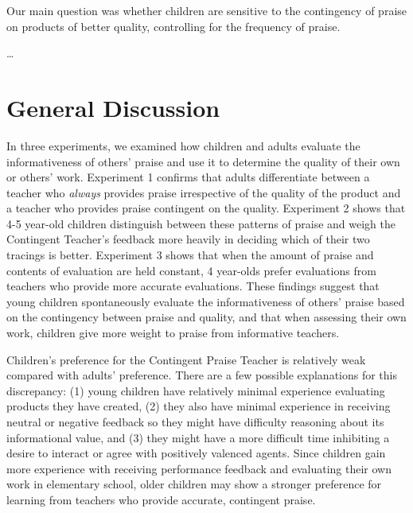 \documentclass[10pt, letterpaper]{article}
\begin{document}
Our main question was whether children are sensitive to the contingency
of praise on products of better quality, controlling for the frequency
of praise.

\ldots{}

\section{General Discussion}\label{general-discussion}

In three experiments, we examined how children and adults evaluate the
informativeness of others' praise and use it to determine the quality of
their own or others' work. Experiment 1 confirms that adults
differentiate between a teacher who \textit{always} provides praise
irrespective of the quality of the product and a teacher who provides
praise contingent on the quality. Experiment 2 shows that 4-5 year-old
children distinguish between these patterns of praise and weigh the
Contingent Teacher's feedback more heavily in deciding which of their
two tracings is better. Experiment 3 shows that when the amount of
praise and contents of evaluation are held constant, 4 year-olds prefer
evaluations from teachers who provide more accurate evaluations. These
findings suggest that young children spontaneously evaluate the
informativeness of others' praise based on the contingency between
praise and quality, and that when assessing their own work, children
give more weight to praise from informative teachers.

Children's preference for the Contingent Praise Teacher is relatively
weak compared with adults' preference. There are a few possible
explanations for this discrepancy: (1) young children have relatively
minimal experience evaluating products they have created, (2) they also
have minimal experience in receiving neutral or negative feedback so
they might have difficulty reasoning about its informational value, and
(3) they might have a more difficult time inhibiting a desire to
interact or agree with positively valenced agents. Since children gain
more experience with receiving performance feedback and evaluating their
own work in elementary school, older children may show a stronger
preference for learning from teachers who provide accurate, contingent
praise.
\end{document}

